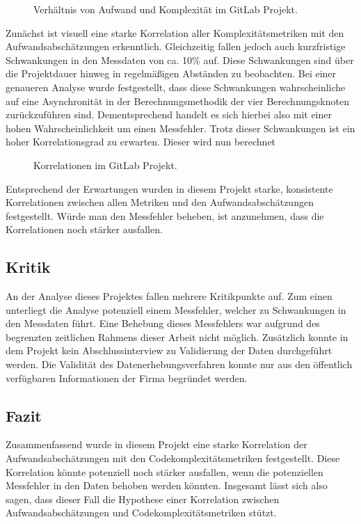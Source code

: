 \begin{figure}\label{gitlab-graph}
  \begin{center}
      
  \end{center}
  \caption{Verhältnis von Aufwand und Komplexität im GitLab Projekt.}
\end{figure}

Zunächst ist visuell eine starke Korrelation aller Komplexitätsmetriken
mit den Aufwandsabschätzungen erkenntlich. Gleichzeitig fallen jedoch
auch kurzfristige Schwankungen in den Messdaten von ca. 10\% auf. Diese
Schwankungen sind über die Projektdauer hinweg in regelmä\ss igen Abständen
zu beobachten. Bei einer genaueren Analyse wurde festgestellt, dass
diese Schwankungen wahrscheinliche auf eine Asynchronität in der
Berechnungsmethodik der vier Berechnungsknoten zurückzuführen sind.
Dementsprechend handelt es sich hierbei also mit einer hohen
Wahrscheinlichkeit um einen Messfehler. Trotz dieser Schwankungen ist
ein hoher Korrelationsgrad zu erwarten. Dieser wird nun berechnet

\begin{figure}\label{gitlab-correlation-graph}
  \begin{center}
      
  \end{center}
  \caption{Korrelationen im GitLab Projekt.}
\end{figure} 

Entsprechend der Erwartungen wurden in diesem Projekt starke,
konsistente Korrelationen zwischen allen Metriken und den
Aufwandsabschätzungen festgestellt. Würde man den Messfehler beheben,
ist anzunehmen, dass die Korrelationen noch stärker ausfallen.

\subsection{Kritik}\label{gitlab-kritik}

An der Analyse dieses Projektes fallen mehrere Kritikpunkte auf. Zum
einen unterliegt die Analyse potenziell einem Messfehler, welcher zu
Schwankungen in den Messdaten führt. Eine Behebung dieses Messfehlers
war aufgrund des begrenzten zeitlichen Rahmens dieser Arbeit nicht
möglich. Zusätzlich konnte in dem Projekt kein Abschlussinterview zu
Validierung der Daten durchgeführt werden. Die Validität des
Datenerhebungsverfahren konnte nur aus den öffentlich verfügbaren
Informationen der Firma begründet werden.

\subsection{Fazit}\label{gitlab-Fazit}

Zusammenfassend wurde in diesem Projekt eine starke Korrelation der
Aufwandsabschätzungen mit den Codekomplexitätsmetriken festgestellt.
Diese Korrelation könnte potenziell noch stärker ausfallen, wenn die
potenziellen Messfehler in den Daten behoben werden könnten. Insgesamt
lässt sich also sagen, dass dieser Fall die Hypothese einer Korrelation
zwischen Aufwandsabschätzungen und Codekomplexitätsmetriken stützt.